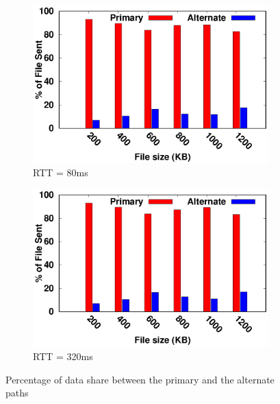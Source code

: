 \begin{figure}[!t]
	\begin{center}
		\begin{subfigure}{.46\linewidth}
			\includegraphics[width=0.95\linewidth]{img/exp4/delay-5}
			\caption{\label{fig:percentSentOverPathRTT80}RTT = 80ms}
		\end{subfigure}
		\hspace{0.1cm}
		\begin{subfigure}{.46\linewidth}
			\includegraphics[width=0.95\linewidth]{img/exp4/delay-20}
			\caption{\label{fig:percentSentOverPathRTT320}RTT = 320ms}
		\end{subfigure}
		
		\caption{\label{fig:percentSentOverPath}Percentage of data share between the primary and the alternate paths}
	\end{center}
\end{figure}


